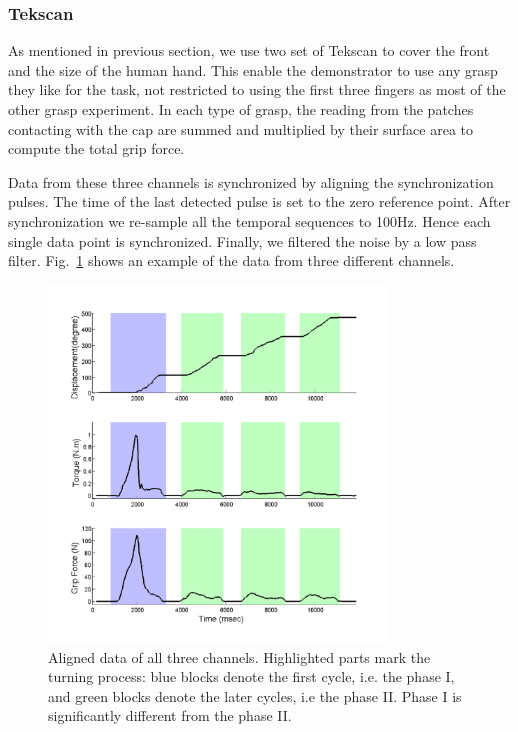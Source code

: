 \subsubsection{Tekscan}
\label{tekscan}
As mentioned in previous section, we use two set of Tekscan to cover the front and the size of the human hand. This enable the demonstrator to use any grasp they like for the task, not restricted to using the first three fingers as most of the other grasp experiment. In each type of grasp, the reading from the patches contacting with the cap are summed and multiplied by their surface area to compute the total grip force.%


Data from these three channels is synchronized by aligning the synchronization pulses. The time of the last detected pulse is set to the zero reference point. After synchronization we re-sample all the temporal sequences to 100Hz. Hence each single data point is synchronized. Finally, we filtered the noise by a low pass filter. Fig.~\ref{fig:3channels} shows an example of the data from three different channels.




\begin{figure}
  \centering
  \hspace{-1cm}
  \includegraphics[width=9cm]{./fig/b3c2_1_sTF.pdf}
  \vspace{-0.5cm}
  \caption{ \scriptsize{Aligned data of all three channels. Highlighted parts mark the turning process: blue blocks denote the first cycle, i.e. the phase I, and green blocks denote the later cycles, i.e the phase II. Phase I is significantly different from the phase II.}
}
\label{fig:3channels}
\end{figure}


